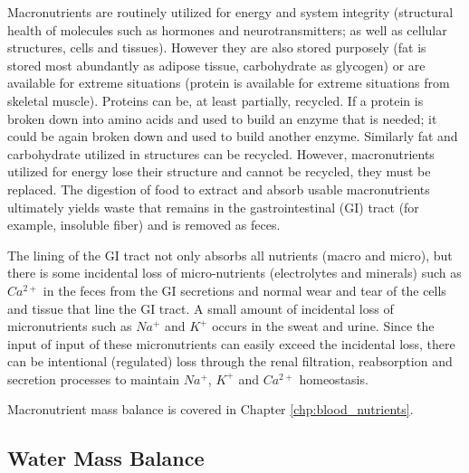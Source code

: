 Macronutrients are routinely utilized for energy and system integrity (structural health of molecules such as hormones and neurotransmitters; as well as cellular structures, cells and tissues). However they are also stored purposely (fat is stored most abundantly as adipose tissue, carbohydrate as glycogen) or are available for extreme situations (protein is available for extreme situations from skeletal muscle). Proteins can be, at least partially, recycled. If a protein is broken down into amino acids and used to build an enzyme that is needed; it could be again broken down and used to build another enzyme. Similarly fat and carbohydrate utilized in structures can be recycled. However, macronutrients utilized for energy lose their structure and cannot be recycled, they must be replaced. The digestion of food to extract and absorb usable macronutrients\footnotemark{} ultimately yields waste that remains in the gastrointestinal (GI) tract (for example, insoluble fiber) and is removed as feces. 

The lining of the GI tract not only absorbs all nutrients (macro and micro), but there is some incidental loss of micro-nutrients (electrolytes and minerals) such as $Ca^{2+}$ in the feces from the GI secretions and normal wear and tear of the cells and tissue that line the GI tract. A small amount of incidental loss of micronutrients such as $Na^+$ and $K^+$ occurs in the sweat and urine. Since the input of input of these micronutrients can easily exceed the incidental loss, there can be intentional (regulated) loss through the renal filtration, reabsorption and secretion processes to maintain $Na^+$, $K^+$ and $Ca^{2+}$ homeostasis.

Macronutrient mass balance is covered in Chapter \ref{chp:blood_nutrients}.

\subsection{Water Mass Balance}

